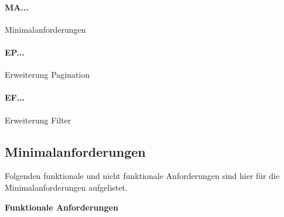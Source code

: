 \paragraph{MA...} Minimalanforderungen
\paragraph{EP...} Erweiterung Pagination
\paragraph{EF...} Erweiterung Filter

\subsection{Minimalanforderungen}\label{ch:minimalanforderungen}
Folgenden funktionale und nicht funktionale Anforderungen sind hier für die Minimalanforderungen aufgelistet.\newline

\noindent \textbf{Funktionale Anforderungen}\newline

